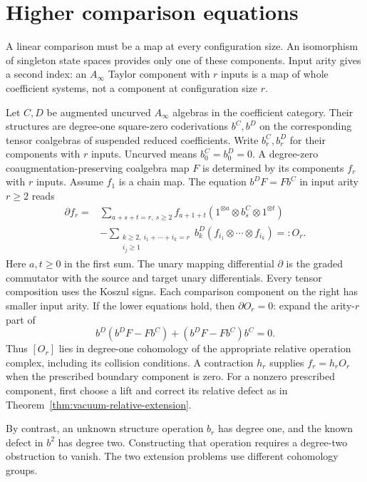 \section{Higher comparison equations}

A linear comparison must be a map at every configuration size.
An isomorphism of singleton state spaces provides only one of
these components.  Input arity gives a second index: an
\(A_\infty\) Taylor component with \(r\) inputs is a map of
whole coefficient systems, not a component at configuration
size \(r\).

Let \(C,D\) be augmented uncurved \(A_\infty\) algebras in the coefficient
category.  Their structures are degree-one square-zero
coderivations \(b^C,b^D\) on the corresponding tensor coalgebras
of suspended reduced coefficients.  Write \(b_r^C,b_r^D\) for
their components with \(r\) inputs.  Uncurved means \(b_0^C=b_0^D=0\).
A degree-zero coaugmentation-preserving coalgebra map \(F\) is
determined by its components
\(f_r\) with \(r\) inputs.  Assume \(f_1\) is a chain map.
The equation \(b^D F=Fb^C\) in
input arity \(r\geq2\) reads
\begin{equation}
\begin{split}
 \partial f_r={}&
 \sum_{a+s+t=r,\ s\geq2}
 f_{a+1+t}(1^{\otimes a}\otimes b_s^C\otimes1^{\otimes t})\\
 &-\sum_{\substack{k\geq2,\ i_1+\cdots+i_k=r\\i_j\geq1}}
 b_k^D(f_{i_1}\otimes\cdots\otimes f_{i_k})=:O_r.
\end{split}
\label{eq:vacuum-higher-comparison}
\end{equation}
Here \(a,t\geq0\) in the first sum.
The unary mapping differential \(\partial\) is the graded
commutator with the source and target unary differentials.  Every
tensor composition uses the Koszul signs.  Each comparison
component on the right has smaller input arity.  If the lower
equations hold, then \(\partial O_r=0\): expand the arity-\(r\)
part of
\[
 b^D(b^DF-Fb^C)+(b^DF-Fb^C)b^C=0.
\]
Thus \([O_r]\) lies in degree-one cohomology of the appropriate
relative operation complex, including its collision conditions.
A contraction \(h_r\) supplies \(f_r=h_rO_r\) when the
prescribed boundary component is zero.  For a nonzero prescribed
component, first choose a lift and correct its relative defect
as in Theorem~\ref{thm:vacuum-relative-extension}.

By contrast, an unknown structure operation \(b_r\) has degree
one, and the known defect in \(b^2\) has degree two.  Constructing
that operation requires a degree-two obstruction to vanish.
The two extension problems use different cohomology groups.


